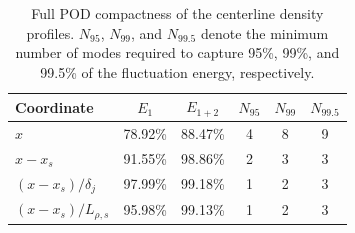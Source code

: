 \begin{table}[t]
\centering
\caption{Full POD compactness of the centerline density profiles. \(N_{95}\), \(N_{99}\), and \(N_{99.5}\) denote the minimum number of modes required to capture 95\%, 99\%, and 99.5\% of the fluctuation energy, respectively.}
\label{tab:prf_v7_full_pod_spectrum}
\begin{tabular}{lccccc}
\toprule
Coordinate & \(E_1\) & \(E_{1+2}\) & \(N_{95}\) & \(N_{99}\) & \(N_{99.5}\) \\
\midrule
\(x\) & 78.92\% & 88.47\% & 4 & 8 & 9 \\
\(x-x_s\) & 91.55\% & 98.86\% & 2 & 3 & 3 \\
\((x-x_s)/\delta_j\) & 97.99\% & 99.18\% & 1 & 2 & 3 \\
\((x-x_s)/L_{\rho,s}\) & 95.98\% & 99.13\% & 1 & 2 & 3 \\
\bottomrule
\end{tabular}
\end{table}
